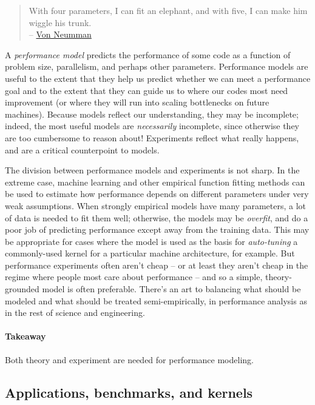 \documentclass[12pt, leqno]{article} %
\begin{document}
\begin{quote}
With four parameters, I can fit an elephant, and with five, I can make
him wiggle his trunk.\\--
\href{https://en.wikiquote.org/wiki/John_von_Neumann}{Von Neumman}
\end{quote}

A \emph{performance model} predicts the performance of some code as a
function of problem size, parallelism, and perhaps other parameters.
Performance models are useful to the extent that they help us predict
whether we can meet a performance goal and to the extent that they can
guide us to where our codes most need improvement (or where they will
run into scaling bottlenecks on future machines). Because models reflect
our understanding, they may be incomplete; indeed, the most useful
models are \emph{necessarily} incomplete, since otherwise they are too
cumbersome to reason about! Experiments reflect what really happens, and
are a critical counterpoint to models.

The division between performance models and experiments is not sharp. In
the extreme case, machine learning and other empirical function fitting
methods can be used to estimate how performance depends on different
parameters under very weak assumptions. When strongly empirical models
have many parameters, a lot of data is needed to fit them well;
otherwise, the models may be \emph{overfit}, and do a poor job of
predicting performance except away from the training data. This may be
appropriate for cases where the model is used as the basis for
\emph{auto-tuning} a commonly-used kernel for a particular machine
architecture, for example. But performance experiments often aren't
cheap -- or at least they aren't cheap in the regime where people most
care about performance -- and so a simple, theory-grounded model is
often preferable. There's an art to balancing what should be modeled and
what should be treated semi-empirically, in performance analysis as in
the rest of science and engineering.

\paragraph{Takeaway}

Both theory and experiment are needed for performance modeling.

\subsection{Applications, benchmarks, and kernels}
\end{document}
